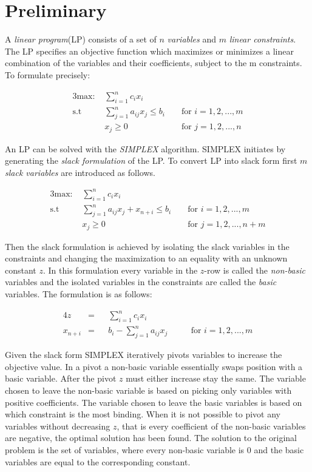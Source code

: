 
\section{Preliminary}
A \textit{linear program}(LP) consists of a set of $n$ \textit{variables} and $m$ \textit{linear constraints}. The LP specifies an objective function which maximizes or minimizes a linear combination of the variables and their coefficients, subject to the m constraints. To formulate precisely:

\begin{alignat}{3}
\text{max: } &\sum_{i=1}^{n} c_i x_i\\
\text{s.t }  & \sum_{j=1}^{n} a_{ij} x_j \leq b_i && \text{ for } i=1,2,...,m\\
             & x_j \geq 0                         && \text{ for } j=1,2,...,n 
\end{alignat}

An LP can be solved with the \textit{SIMPLEX} algorithm. SIMPLEX initiates by generating the \textit{slack formulation} of the LP. To convert LP into slack form first $m$ \textit{slack variables} are introduced as follows.

\begin{alignat}{3}
\text{max: } &\sum_{i=1}^{n} c_i x_i\\
\text{s.t }  & \sum_{j=1}^{n} a_{ij} x_j + x_{n+i} \leq b_i  && \text{ for } i=1,2,...,m\\
             & x_j \geq 0                                    && \text{ for } j=1,2,...,n+m
\end{alignat}

Then the slack formulation is achieved by isolating the slack variables in the constraints and changing the maximization to an equality with an unknown constant $z$. In this formulation every variable in the $z$-row is called the \textit{non-basic} variables and the isolated variables in the constraints are called the \textit{basic} variables. The formulation is as follows:

\begin{alignat}{4}
z        &= && \sum_{i=1}^{n} c_ix_i\\
x_{n+i}  &= && b_i - \sum_{j=1}^{n} a_{ij} x_j  &&& \text{ for } i=1,2,...,m
\end{alignat}

Given the slack form SIMPLEX iteratively pivots variables to increase the objective value. In a pivot a non-basic variable essentially swaps position with a basic variable. After the pivot $z$ must either increase stay the same. The variable chosen to leave the non-basic variable is based on picking only variables with positive coefficients. The variable chosen to leave the basic variables is based on which constraint is the most binding. When it is not possible to pivot any variables without decreasing $z$, that is every coefficient of the non-basic variables are negative, the optimal solution has been found. The solution to the original problem is the set of variables, where every non-basic variable is $0$ and the basic variables are equal to the corresponding constant.

